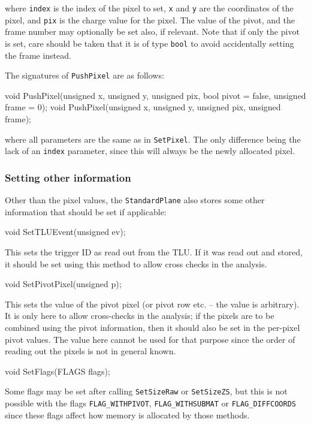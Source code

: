 where \texttt{index} is the index of the pixel to set, \texttt{x} and \texttt{y} are the coordinates of the pixel,
and \texttt{pix} is the charge value for the pixel.
The value of the pivot, and the frame number may optionally be set also, if relevant.
Note that if only the pivot is set, care should be taken that it is of type \texttt{bool}
to avoid accidentally setting the frame instead.

The signatures of \texttt{PushPixel} are as follows:
\begin{listing}
void PushPixel(unsigned x, unsigned y, unsigned pix,
               bool pivot = false, unsigned frame = 0);
void PushPixel(unsigned x, unsigned y, unsigned pix,
               unsigned frame);
\end{listing}

where all parameters are the same as in \texttt{SetPixel}.
The only difference being the lack of an \texttt{index} parameter,
since this will always be the newly allocated pixel.

\subsubsection{Setting other information}
Other than the pixel values, the \texttt{StandardPlane} also stores some other information
that should be set if applicable:

\begin{listing}
void SetTLUEvent(unsigned ev);
\end{listing}

This sets the trigger ID as read out from the \gls{TLU}.
If it was read out and stored, it should be set using this method to allow cross checks in the analysis.

\begin{listing}
void SetPivotPixel(unsigned p);
\end{listing}

This sets the value of the pivot pixel (or pivot row etc. -- the value is arbitrary).
It is only here to allow cross-checks in the analysis;
if the pixels are to be combined using the pivot information,
then it should also be set in the per-pixel pivot values.
The value here cannot be used for that purpose since the order of reading out the pixels is not in general known.

\begin{listing}
void SetFlags(FLAGS flags);
\end{listing}

Some flags may be set after calling \texttt{SetSizeRaw} or \texttt{SetSizeZS}, but this is not possible with the flags
\texttt{FLAG\_WITHPIVOT}, \texttt{FLAG\_WITHSUBMAT} or \texttt{FLAG\_DIFFCOORDS} since these
flags affect how memory is allocated by those methods.

